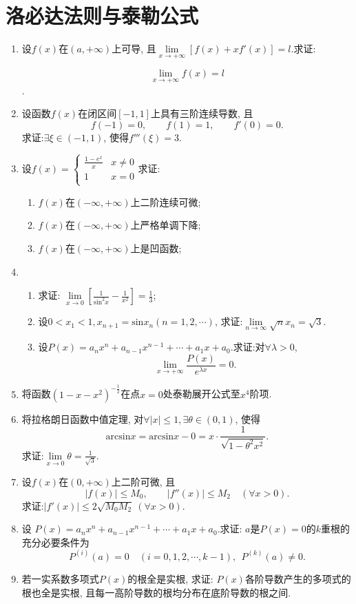 \section{洛必达法则与泰勒公式}
\begin{enumerate}
\item 设$f(x)$在$(a,+\infty)$上可导, 且$\lim\limits_{x\rightarrow +\infty}[f(x)+xf'(x)]=l$.求证:

$$\lim\limits_{x \rightarrow +\infty}f(x)=l$$.

\item 设函数$f(x)$在闭区间$[-1,1]$上具有三阶连续导数, 且
$$
f(-1) = 0,\qquad f(1) = 1,\qquad f'(0)=0.
$$
求证:$\exists \xi \in (-1,1)$, 使得$f'''(\xi)=3$.
\item 设$f\left( x \right) =\begin{cases}
\frac{1-e^x}{x}&		x\ne 0\\
1&		x=0\\
\end{cases}
$求证: 
\begin{enumerate}
	\item $f(x)$在$(-\infty,+\infty)$上二阶连续可微;
	\item $f(x)$在$(-\infty,+\infty)$上严格单调下降;
	\item $f(x)$在$(-\infty,+\infty)$上是凹函数;
\end{enumerate}
\item 
\begin{enumerate}
\item 求证: $\lim\limits_{x\rightarrow 0}[\frac{1}{\mathrm{sin}^2x}-\frac{1}{x^2}]=\frac{1}{3}$;
\item 设$0<x_1<1,x_{n+1}=\mathrm{sin}x_n(n=1,2,\cdots)$, 求证:$\lim\limits_{n\rightarrow \infty}\sqrt{n}x_n=\sqrt{3}$.
\item 设$P(x)=a_nx^n+a_{n-1}x^{n-1}+\cdots+a_1x+a_0$.求证:对$\forall \lambda >0$, 
$$ \lim\limits_{x \rightarrow +\infty}\frac{P(x)}{e^{\lambda x}}=0.
$$
\end{enumerate}
\item 将函数$(1-x-x^2)^{-\frac{1}{2}}$在点$x=0$处泰勒展开公式至$x^4$阶项.
\item 将拉格朗日函数中值定理, 对$\forall |x|\le 1, \exists \theta \in (0,1)$, 使得
$$ \mathrm{arcsin}x=\mathrm{arcsin}x - 0 = x\cdot \frac{1}{\sqrt{1-\theta^2x^2}}.$$
求证:$\lim\limits_{x \rightarrow 0}\theta=\frac{1}{\sqrt{3}}$.
\item 设$f(x)$在$(0,+\infty)$上二阶可微, 且
$$ |f(x)|\le M_0,\qquad |f''(x)|\le M_2 \quad (\forall x>0).$$
求证:$|f'(x)|\le 2\sqrt{M_0M_2}\ (\forall x>0).$
\item 设 $P(x)=a_nx^n+a_{n-1}x^{n-1}+\cdots +a_1x+a_0$.求证: $a$是$P(x)=0$的$k$重根的充分必要条件为
$$ P^{(i)}(a)=0\quad (i=0,1,2,\cdots,k-1),\ \ P^{(k)}(a) \ne 0.
$$
\item 若一实系数多项式$P(x)$的根全是实根, 求证: $P(x)$各阶导数产生的多项式的根也全是实根, 且每一高阶导数的根均分布在底阶导数的根之间.
\end{enumerate}

